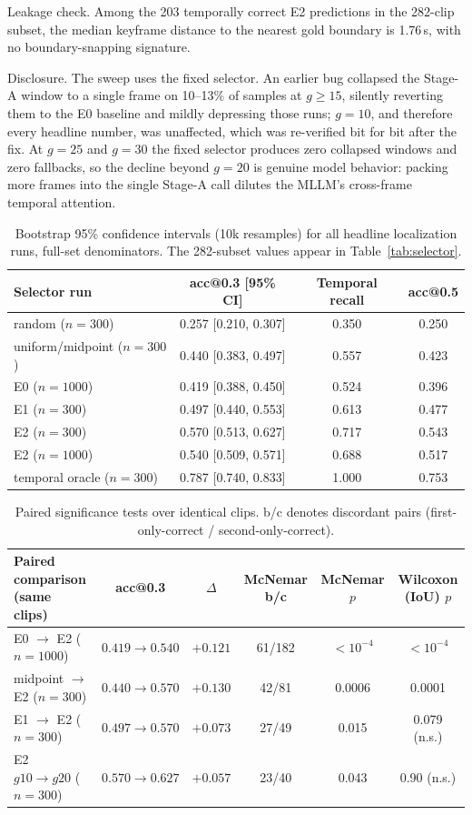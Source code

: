 \documentclass[10pt]{article}
\begin{document}
Leakage check. Among the 203 temporally correct E2 predictions in the 282-clip subset, the median keyframe distance to the nearest gold boundary is 1.76\,s, with no boundary-snapping signature.

Disclosure. The sweep uses the fixed selector. An earlier bug collapsed the Stage-A window to a single frame on 10--13\% of samples at $g \ge 15$, silently reverting them to the E0 baseline and mildly depressing those runs; $g=10$, and therefore every headline number, was unaffected, which was re-verified bit for bit after the fix. At $g=25$ and $g=30$ the fixed selector produces zero collapsed windows and zero fallbacks, so the decline beyond $g=20$ is genuine model behavior: packing more frames into the single Stage-A call dilutes the MLLM's cross-frame temporal attention.

\begin{table}[htbp]
\centering
\small
\begin{tabular}{lccc}
\toprule
Selector run & acc@0.3 [95\% CI] & Temporal recall & acc@0.5 \\
\midrule
random ($n=300$) & 0.257 [0.210, 0.307] & 0.350 & 0.250 \\
uniform/midpoint ($n=300$) & 0.440 [0.383, 0.497] & 0.557 & 0.423 \\
E0 ($n=1000$) & 0.419 [0.388, 0.450] & 0.524 & 0.396 \\
E1 ($n=300$) & 0.497 [0.440, 0.553] & 0.613 & 0.477 \\
E2 ($n=300$) & 0.570 [0.513, 0.627] & 0.717 & 0.543 \\
E2 ($n=1000$) & 0.540 [0.509, 0.571] & 0.688 & 0.517 \\
temporal oracle ($n=300$) & 0.787 [0.740, 0.833] & 1.000 & 0.753 \\
\bottomrule
\end{tabular}
\caption{Bootstrap 95\% confidence intervals (10k resamples) for all headline localization runs, full-set denominators. The 282-subset values appear in Table~\ref{tab:selector}.}
\label{tab:ci}
\end{table}

\begin{table}[htbp]
\centering
\small
\begin{tabular}{lccccc}
\toprule
Paired comparison (same clips) & acc@0.3 & $\Delta$ & McNemar b/c & McNemar $p$ & Wilcoxon (IoU) $p$ \\
\midrule
E0 $\rightarrow$ E2 ($n=1000$) & $0.419 \rightarrow 0.540$ & $+0.121$ & 61/182 & $<10^{-4}$ & $<10^{-4}$ \\
midpoint $\rightarrow$ E2 ($n=300$) & $0.440 \rightarrow 0.570$ & $+0.130$ & 42/81 & 0.0006 & 0.0001 \\
E1 $\rightarrow$ E2 ($n=300$) & $0.497 \rightarrow 0.570$ & $+0.073$ & 27/49 & 0.015 & 0.079 (n.s.) \\
E2 $g10 \rightarrow g20$ ($n=300$) & $0.570 \rightarrow 0.627$ & $+0.057$ & 23/40 & 0.043 & 0.90 (n.s.) \\
\bottomrule
\end{tabular}
\caption{Paired significance tests over identical clips. b/c denotes discordant pairs (first-only-correct / second-only-correct).}
\label{tab:sig}
\end{table}
\end{document}
